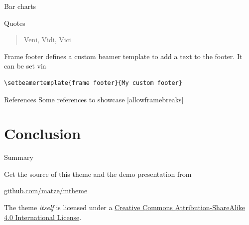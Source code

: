 \documentclass[10pt]{beamer}
\begin{document}
\begin{frame}{Bar charts}
  \begin{figure}
  \end{figure}
\end{frame}
\begin{frame}{Quotes}
  \begin{quote}
    Veni, Vidi, Vici
  \end{quote}
\end{frame}

{%
\begin{frame}[fragile]{Frame footer}
    \themename defines a custom beamer template to add a text to the footer. It can be set via
    \begin{verbatim}\setbeamertemplate{frame footer}{My custom footer}\end{verbatim}
\end{frame}
}

\begin{frame}{References}
  Some references to showcase [allowframebreaks] \cite{knuth92,ConcreteMath,Simpson,Er01,greenwade93}
\end{frame}

\section{Conclusion}

\begin{frame}{Summary}

  Get the source of this theme and the demo presentation from

  \begin{center}\url{github.com/matze/mtheme}\end{center}

  The theme \emph{itself} is licensed under a
  \href{http://creativecommons.org/licenses/by-sa/4.0/}{Creative Commons
  Attribution-ShareAlike 4.0 International License}.

  \begin{center}\ccbysa\end{center}

\end{frame}
\end{document}

